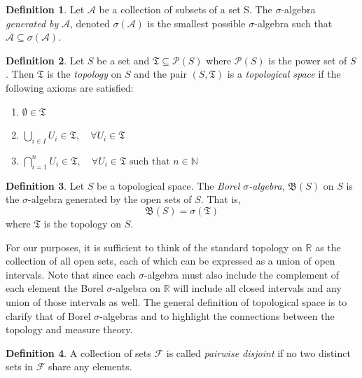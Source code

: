 \documentclass[12pt]{article}
\theoremstyle{definition}
\newtheorem{definition}{Definition}[section]
\theoremstyle{plain}
\theoremstyle{remark}
\begin{document}
\begin{definition}
Let $\mathcal{A}$ be a collection of subsets of a set S.  The $\sigma$-algebra \textit{generated by} $\mathcal{A}$, denoted $\sigma(\mathcal{A})$ is the smallest possible $\sigma$-algebra such that $\mathcal{A} \subseteq \sigma(\mathcal{A})$.
\end{definition}

\begin{definition}
Let $S$ be a set and $\mathfrak{T} \subseteq \mathcal{P}(S)$ where $\mathcal{P}(S)$ is the power set of $S$.  Then $\mathfrak{T}$ is the \textit{topology} on $S$ and the pair $(S,\mathfrak{T})$ is a \textit{topological space} if the following axioms are satisfied:
\begin{enumerate}[label=(\roman*)]
    \item $\emptyset \in \mathfrak{T}$
    \item $\bigcup_{i \in I} U_i \in \mathfrak{T},\quad \forall U_i \in \mathfrak{T}$
    \item $\bigcap_{i=1}^{n} U_i \in \mathfrak{T}, \quad\forall U_i \in \mathfrak{T} \text{ such that } n \in \mathbb{N}$
\end{enumerate}

\end{definition}

\begin{definition}
Let $S$ be a topological space.  The \textit{Borel $\sigma$-algebra}, $\mathfrak{B}(S)$ on $S$ is the $\sigma$-algebra generated by the open sets of $S$.  That is,
\[
    \mathfrak{B}(S)=\sigma(\mathfrak{T}) 
\]
where $\mathfrak{T}$ is the topology on $S$.
\end{definition}

For our purposes, it is sufficient to think of the standard topology on $\mathbb{R}$ as the collection of all open sets, each of which can be expressed as a union of open intervals.  Note that since each $\sigma$-algebra must also include the complement of each element the Borel $\sigma$-algebra on $\mathbb{R}$ will include all closed intervals and any union of those intervals as well.  The general definition of topological space is to clarify that of Borel $\sigma$-algebras and to highlight the connections between the topology and measure theory.

\begin{definition}
A collection of sets $\mathcal{F}$ is called \textit{pairwise disjoint} if no two distinct sets in $\mathcal{F}$ share any elements.
\end{definition}
\end{document}
